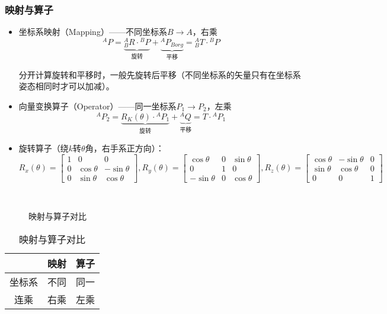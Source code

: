 \documentclass[
12pt, %
a4paper, 
oneside, %
headinclude,footinclude, %
]{scrartcl}
\begin{document}
\subsubsection[映射与算子]{映射与算子}
\begin{itemize}
\item 坐标系映射（Mapping）——不同坐标系$ B \rightarrow A $，右乘
$$ {}^A P = \underbrace{{}^A_B R \cdot {}^B P}_{\text{旋转}} + \underbrace{{}^A P_{Borg}}_{\text{平移}} = {}^A_B T \cdot {}^B P $$

\hspace{2em}
分开计算旋转和平移时，一般先旋转后平移（不同坐标系的矢量只有在坐标系姿态相同时才可以加减）。
\item 向量变换算子（Operator）——同一坐标系$ P_1 \rightarrow P_2 $，左乘
$$ {}^A P_2 = \underbrace{R_K(\theta) \cdot {}^A P_1}_{\text{旋转}} + \underbrace{{}^A Q}_{\text{平移}} = T \cdot {}^A P_1 $$
\item 旋转算子（绕$ k $转$ \theta $角，右手系正方向）：
$$
R_x(\theta) = \begin{bmatrix} 1 & 0 & 0 \\ 0 & \cos\theta & -\sin\theta \\ 0 & \sin\theta & \cos\theta \end{bmatrix}, 
R_y(\theta) = \begin{bmatrix} \cos\theta & 0 & \sin\theta \\ 0 & 1 & 0 \\ -\sin\theta & 0 & \cos\theta \end{bmatrix}, 
R_z(\theta) = \begin{bmatrix} \cos\theta & -\sin\theta & 0 \\ \sin\theta & \cos\theta & 0 \\ 0 & 0 & 1 \end{bmatrix}
$$
\end{itemize}
\begin{minipage}{0.6\textwidth}
\begin{figure}[H]
\centering
{} \quad
{}\\
 \quad
{}
\caption{映射与算子对比}
\end{figure}
\end{minipage}
\begin{minipage}{0.4\textwidth}
\begin{table}[H]
\centering
\begin{tabular}{c|cc}
\hline
& 映射 & 算子 \\
\hline
坐标系 & 不同 & 同一 \\
连乘 & 右乘 & 左乘 \\
\hline
\end{tabular}
\caption{映射与算子对比}
\end{table}
\end{minipage}
\end{document}
